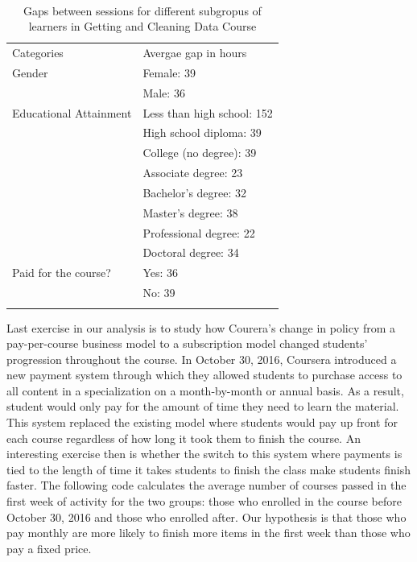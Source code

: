 \begin{table}
\footnotesize
\caption{Gaps between sessions for different subgropus of learners in Getting and Cleaning Data Course}\
\centering
\label{tab:timecats}
\begin{tabular}{p{3cm}|p{4cm}}
Categories & Avergae gap in hours \\
\addlinespace
\toprule
Gender & Female: 39\\
       & Male: 36\\
\midrule
Educational Attainment & Less than high school: 152\\
           & High school diploma: 39\\
           & College (no degree): 39\\
           & Associate degree: 23\\
           & Bachelor's degree: 32\\
           & Master's degree: 38\\
           & Professional degree: 22\\
           & Doctoral degree: 34\\
\midrule
Paid for the course? & Yes: 36\\
           & No: 39\\
\addlinespace
\bottomrule
\end{tabular}
\end{table}

Last exercise in our analysis is to study how Courera's change in policy
from a pay-per-course business model to a subscription model changed
students' progression throughout the course. In October 30, 2016,
Coursera introduced a new payment system through which they allowed
students to purchase access to all content in a specialization on a
month-by-month or annual basis. As a result, student would only pay for
the amount of time they need to learn the material. This system replaced
the existing model where students would pay up front for each course
regardless of how long it took them to finish the course. An interesting
exercise then is whether the switch to this system where payments is
tied to the length of time it takes students to finish the class make
students finish faster. The following code calculates the average number
of courses passed in the first week of activity for the two groups:
those who enrolled in the course before October 30, 2016 and those who
enrolled after. Our hypothesis is that those who pay monthly are more
likely to finish more items in the first week than those who pay a fixed
price.

